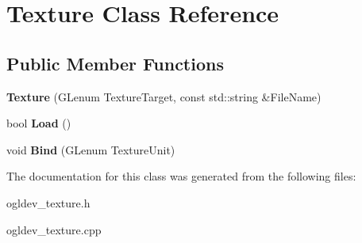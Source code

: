 \hypertarget{classTexture}{\section{Texture Class Reference}
\label{classTexture}
}
\subsection*{Public Member Functions}
\begin{DoxyCompactItemize}
\item 
\hypertarget{classTexture_ab4694b9f76d6e348a844065481a89aa1}{{\bfseries Texture} (G\-Lenum Texture\-Target, const std\-::string \&File\-Name)}\label{classTexture_ab4694b9f76d6e348a844065481a89aa1}

\item 
\hypertarget{classTexture_a4ccaf8f0017dd26ccd824fc2e24c9a27}{bool {\bfseries Load} ()}\label{classTexture_a4ccaf8f0017dd26ccd824fc2e24c9a27}

\item 
\hypertarget{classTexture_afac0ee53fc89f153418d6cfa6f575fbe}{void {\bfseries Bind} (G\-Lenum Texture\-Unit)}\label{classTexture_afac0ee53fc89f153418d6cfa6f575fbe}

\end{DoxyCompactItemize}


The documentation for this class was generated from the following files\-:\begin{DoxyCompactItemize}
\item 
ogldev\-\_\-texture.\-h\item 
ogldev\-\_\-texture.\-cpp\end{DoxyCompactItemize}

